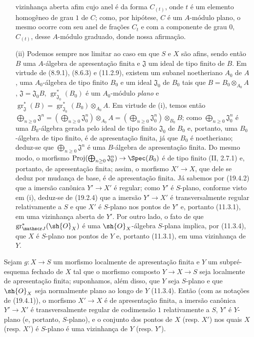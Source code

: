 \begin{enumerate}
vizinhança aberta afim cujo anel é da forma $C_{(t)}$, onde $t$ é um elemento homogêneo de grau $1$ de $C$; como, por hipótese, $C$ é um $A$-módulo plano, o mesmo ocorre com seu anel de frações $C_t$ e com a componente de grau $0$, $C_{(t)}$, desse $A$-módulo graduado, donde nossa afirmação.
  \item[(ii)] Podemos sempre nos limitar ao caso em que $S$ e $X$ são afins, sendo então $B$ uma $A$-álgebra de apresentação finita e $\mathfrak J$ um ideal de tipo finito de $B$. Em virtude de (8.9.1), (8.6.3) e (11.2.9), existem um subanel noetheriano $A_0$ de $A$, uma $A_0$-álgebra de tipo finito $B_0$ e um ideal $\mathfrak J_0$ de $B_0$ tais que $B=B_0\otimes_{A_0}A$, $\mathfrak J=\mathfrak J_0B$, $\operatorname{gr}_{\mathfrak J_0}^*(B_0)$ é um $A_0$-módulo \emph{plano} e $\operatorname{gr}_{\mathfrak J}^*(B)=\operatorname{gr}_{\mathfrak J_0}^*(B_0)\otimes_{A_0}A$. Em virtude de (i), temos então $\bigoplus_{n\geq0}\mathfrak J^n=(\bigoplus_{n\geq0}\mathfrak J_0^n)\otimes_{A_0}A=(\bigoplus_{n\geq0}\mathfrak J_0^n)\otimes_{B_0}B$; como $\bigoplus_{n\geq0}\mathfrak J_0^n$ é uma $B_0$-álgebra gerada pelo ideal de tipo finito $\mathfrak J_0$ de $B_0$ e, portanto, uma $B_0$-álgebra de tipo finito, é de apresentação finita, já que $B_0$ é noetheriano; deduz-se que $\bigoplus_{n\geq0}\mathfrak J^n$ é uma $B$-álgebra de apresentação finita. Do mesmo modo, o morfismo $\operatorname{Proj}(\bigoplus_{n\geq0}\mathfrak J_0^n)\to\Spec(B_0)$ é de tipo finito (II, 2.7.1) e, portanto, de apresentação finita; assim, o morfismo $X'\to X$, que dele se deduz por mudança de base, é de apresentação finita. Já sabemos por (19.4.2) que a imersão canônica $Y'\to X'$ é regular; como $Y'$ é $S$-plano, conforme visto em (i), deduz-se de (19.2.4) que a imersão $Y'\to X'$ é transversalmente regular relativamente a $S$ e que $X'$ é $S$-plano nos pontos de $Y'$ e, portanto (11.3.1), em uma vizinhança aberta de $Y'$. Por outro lado, o fato de que $\operatorname{gr}_{\mathscr J}^*(\sh{O}_X)$ é uma $\sh{O}_X$-álgebra $S$-plana implica, por (11.3.4), que $X$ é $S$-plano nos pontos de $Y$ e, portanto (11.3.1), em uma vizinhança de $Y$.
\end{enumerate}

\begin{corollary}[19.4.7]
\label{IV.19.4.7}
Sejam $g:X\to S$ um morfismo localmente de apresentação finita e $Y$ um subpré-esquema fechado de $X$ tal que o morfismo composto $Y\to X\to S$ seja localmente de apresentação finita; suponhamos, além disso, que $Y$ seja $S$-plano e que $\sh{O}_X$ seja normalmente plano ao longo de $Y$ (11.3.4). Então (com as notações de (19.4.1)), o morfismo $X'\to X$ é de apresentação finita, a imersão canônica $Y'\to X'$ é transversalmente regular de codimensão $1$ relativamente a $S$, $Y'$ é $Y$-plano (e, portanto, $S$-plano), e o conjunto dos pontos de $X$ (resp. $X'$) nos quais $X$ (resp. $X'$) é $S$-plano é uma vizinhança de $Y$ (resp. $Y'$).
\end{corollary}


